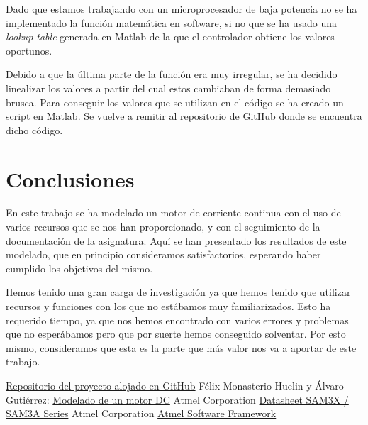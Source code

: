 \documentclass[a4paper]{article}
\begin{document}
Dado que estamos trabajando con un microprocesador de baja potencia no se ha implementado la función matemática en software, si no que se ha usado una \emph{lookup table} generada
en Matlab de la que el controlador obtiene los valores oportunos.

Debido a que la última parte de la función era muy irregular, se ha decidido linealizar los valores a partir del cual estos cambiaban de forma demasiado brusca. Para conseguir los valores
que se utilizan en el código se ha creado un script en Matlab. Se vuelve a remitir al repositorio de GitHub \cite{git} donde se encuentra dicho código.

\section{Conclusiones}
En este trabajo se ha modelado un motor de corriente continua con el uso de varios recursos que se nos han proporcionado, y con el seguimiento de la documentación de la asignatura. Aquí se han presentado los
resultados de este modelado, que en principio consideramos satisfactorios, esperando haber cumplido los objetivos del mismo.

Hemos tenido una gran carga de investigación ya que hemos tenido que utilizar recursos y funciones con los que no estábamos muy familiarizados. Esto ha requerido tiempo, ya que nos hemos
encontrado con varios errores y problemas que no esperábamos pero que por suerte hemos conseguido solventar. Por esto mismo, consideramos que esta es la parte que más valor nos va a aportar de
este trabajo.


\begin{thebibliography}{9}
 \href{https://github.com/jjalberca/reallabo2018}{Repositorio del proyecto alojado en GitHub}
 Félix Monasterio-Huelin y Álvaro Gutiérrez: \href{http://robolabo.etsit.upm.es/asignaturas/seco/apuntes/modelado.pdf}{Modelado de un motor DC}
 Atmel Corporation \href{http://ww1.microchip.com/downloads/en/DeviceDoc/Atmel-11057-32-bit-Cortex-M3-Microcontroller-SAM3X-SAM3A_Datasheet.pdf}{Datasheet SAM3X / SAM3A Series}
 Atmel Corporation \href{http://asf.atmel.com/docs/latest/search.html?device=sam3x}{Atmel Software Framework}
\end{thebibliography}
\end{document}
